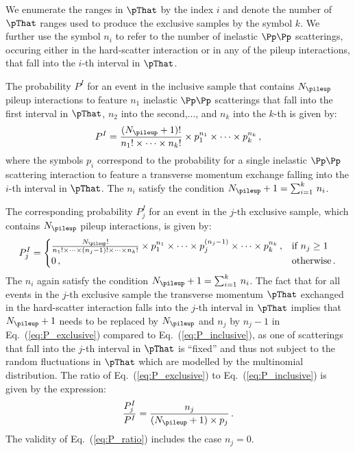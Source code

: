 We enumerate the ranges in $\pThat$ by the index $i$ and denote the number of $\pThat$ ranges used to produce the exclusive samples by the symbol $k$.
We further use the symbol $n_{i}$ to refer to the number of inelastic $\Pp\Pp$ scatterings,
occuring either in the hard-scatter interaction or in any of the pileup interactions,
that fall into the $i$-th interval in $\pThat$.

The probability $P^{I}$ for an event in the inclusive sample that contains $N_{\pileup}$ pileup interactions
to feature $n_{1}$ inelastic $\Pp\Pp$ scatterings that fall into the first interval in $\pThat$, $n_{2}$ into the second,$\dots$, and $n_{k}$ into the $k$-th 
is given by:
\begin{equation}
P^{I} = \frac{(N_{\pileup} + 1)!}{n_{1}! \times \dots \times n_{k}!} \times p_{1}^{n_{1}} \times \dots \times p_{k}^{n_{k}} \, ,
\label{eq:P_inclusive}
\end{equation}
where the symbols $p_{i}$ correspond to the probability for a single inelastic $\Pp\Pp$ scattering interaction to feature a transverse momentum exchange falling into the $i$-th interval in $\pThat$.
The $n_{i}$ satisfy the condition $N_{\pileup} + 1 = \sum_{i=1}^{k} \, n_{i}$.

The corresponding probability $P_{j}^{I}$ for an event in the $j$-th exclusive sample, which contains $N_{\pileup}$ pileup interactions,
is given by:
\begin{equation}
P_{j}^{I} = \begin{cases}
\frac{N_{\pileup}!}{n_{1}! \times \dots \times (n_{j} - 1)! \times \dots \times n_{k}!} \times p_{1}^{n_{1}} \times \dots \times p_{j}^{(n_{j} - 1)} \times \dots \times p_{k}^{n_{k}} \, ,
  & \text{if $n_{j} \geq 1$} \\
0 \, , & \text{otherwise} \, .
\end{cases}
\label{eq:P_exclusive}
\end{equation}
The $n_{i}$ again satisfy the condition $N_{\pileup} + 1 = \sum_{i=1}^{k} \, n_{i}$.
The fact that for all events in the $j$-th exclusive sample the transverse momentum $\pThat$ exchanged in the hard-scatter interaction falls into the $j$-th interval in $\pThat$
implies that $N_{\pileup} + 1$ needs to be replaced by $N_{\pileup}$ and $n_{j}$ by $n_{j} - 1$ in Eq.~(\ref{eq:P_exclusive}) compared to Eq.~(\ref{eq:P_inclusive}),
as one of scatterings that fall into the $j$-th interval in $\pThat$ is ``fixed'' and thus not subject to the random fluctuations in $\pThat$ which are modelled by the multinomial distribution.
The ratio of Eq.~(\ref{eq:P_exclusive}) to Eq.~(\ref{eq:P_inclusive}) is given by the expression:
\begin{equation}
\frac{P_{j}^{I}}{P^{I}} = \frac{n_{j}}{(N_{\pileup} + 1) \times p_{j}} \, .
\label{eq:P_ratio}
\end{equation}
The validity of Eq.~(\ref{eq:P_ratio}) includes the case $n_{j} = 0$.

